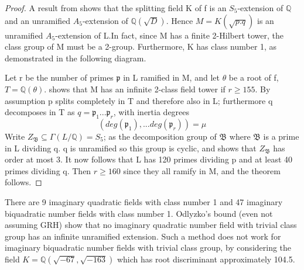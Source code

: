 \documentclass[preprint,12pt,reqno]{elsarticle}
\begin{document}
\begin{proof}
A result from \cite{KOND} shows that the splitting field K
of f is an $S_5$-extension of $\mathbb{Q}$ and an unramified $A_5$-extension of $\mathbb{Q}(\sqrt{D})$. Hence $M=K(\sqrt{p.q})$ is an
unramified $A_5$-extension of L.In fact, since M has a finite 2-Hilbert tower, the class group of M must be a 2-group.  Furthermore, K has class number 1, as demonstrated in the following diagram.
\begin{center}
\end{center}

Let r be the number of primes $\mathfrak{p}$ in L ramified in M, and let $\theta$ be a root of f, $T = \mathbb{Q}(\theta)$. \cite{MAR1} shows that M has an infinite 2-class field tower if $r\geq 155$. By assumption p splits completely in T and therefore also in L; furthermore q decomposes in T as $q = \mathfrak{p}_1...\mathfrak{p}_r$, with inertia degrees
\begin{equation}
    (deg(\mathfrak{p}_1),...deg(\mathfrak{p}_r))=\mu 
\end{equation}
Write $Z_\mathfrak{B}\subseteq\Gamma(L/\mathbb{Q}) = S_5$; as the decomposition group of $\mathfrak{B}$ where $\mathfrak{B}$ is a prime in L dividing q. q is unramified so this group is cyclic, and \cite{ART1} shows that $Z_\mathfrak{B}$ has order at most 3.  It now follows that L has 120 primes dividing p and at least 40 primes dividing q. Then $r\geq 160$ since they all ramify in M, and the theorem follows.
\end{proof}
There are 9 imaginary quadratic fields with class number 1 and 47 imaginary biquadratic number fields with class number 1. Odlyzko's bound (even not assuming GRH) show that no imaginary quadratic number field with trivial class group has an infinite unramified extension. Such a method does not work for imaginary biquadratic number fields with trivial class group, by considering the field $K=\mathbb{Q}(\sqrt{-67},\sqrt{-163})$ which has root discriminant approximately 104.5.
\end{document}
